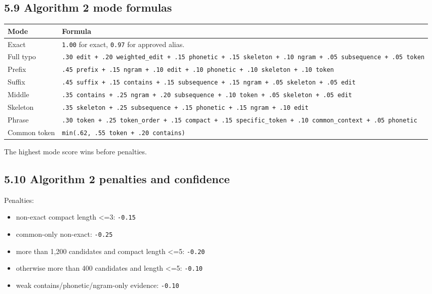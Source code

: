 \subsection{5.9 Algorithm 2 mode formulas}\label{59-algorithm-2-mode-formulas}

{\def\LTcaptype{none} %
\begin{longtable}[]{@{}>{\RaggedRight\arraybackslash}p{.27\linewidth}>{\RaggedRight\arraybackslash}p{.66\linewidth}@{}}
\toprule\noalign{}
Mode & Formula \\
\midrule\noalign{}
\endhead
\bottomrule\noalign{}
\endlastfoot
Exact & \texttt{1.00} for exact, \texttt{0.97} for approved alias. \\
Full typo & \texttt{.30\ edit\ +\ .20\ weighted\_\allowbreak{}edit\ +\ .15\ phonetic\ +\ .15\ skeleton\ +\ .10\ ngram\ +\ .05\ subsequence\ +\ .05\ token} \\
Prefix & \texttt{.45\ prefix\ +\ .15\ ngram\ +\ .10\ edit\ +\ .10\ phonetic\ +\ .10\ skeleton\ +\ .10\ token} \\
Suffix & \texttt{.45\ suffix\ +\ .15\ contains\ +\ .15\ subsequence\ +\ .15\ ngram\ +\ .05\ skeleton\ +\ .05\ edit} \\
Middle & \texttt{.35\ contains\ +\ .25\ ngram\ +\ .20\ subsequence\ +\ .10\ token\ +\ .05\ skeleton\ +\ .05\ edit} \\
Skeleton & \texttt{.35\ skeleton\ +\ .25\ subsequence\ +\ .15\ phonetic\ +\ .15\ ngram\ +\ .10\ edit} \\
Phrase & \texttt{.30\ token\ +\ .25\ token\_\allowbreak{}order\ +\ .15\ compact\ +\ .15\ specific\_\allowbreak{}token\ +\ .10\ common\_\allowbreak{}context\ +\ .05\ phonetic} \\
Common token & \texttt{min(.62,\ .55\ token\ +\ .20\ contains)} \\
\end{longtable}
}

The highest mode score wins before penalties.

\subsection{5.10 Algorithm 2 penalties and confidence}\label{510-algorithm-2-penalties-and-confidence}

Penalties:

\begin{itemize}
\tightlist
\item
  non-exact compact length \textless=3: \texttt{-0.15}
\item
  common-only non-exact: \texttt{-0.25}
\item
  more than 1,200 candidates and compact length \textless=5: \texttt{-0.20}
\item
  otherwise more than 400 candidates and length \textless=5: \texttt{-0.10}
\item
  weak contains/phonetic/ngram-only evidence: \texttt{-0.10}
\end{itemize}

